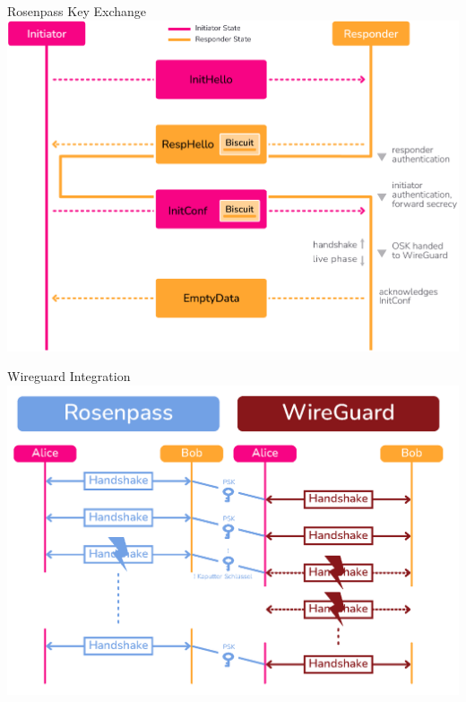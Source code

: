 \documentclass{rosenpass-beamer}
\begin{document}

\begin{frame}{Rosenpass Key Exchange}
  \includegraphics[height=.9\textheight]{graphics/rosenpass-wp-key-exchange-protocol-rgb.pdf}
\end{frame}


\begin{frame}{Wireguard Integration\cite{cryptoeprint:2016/1017}}
  \includegraphics[height=.9\textheight]{assets/rosenpass-wireguard.png}
\end{frame}
\end{document}
